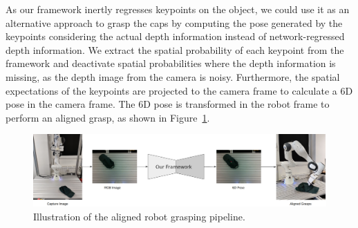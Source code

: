 As our framework inertly regresses keypoints on the object, we could use it as an alternative approach to grasp the caps by computing the pose
generated by the keypoints considering the actual depth information instead of network-regressed depth information.
We extract the spatial probability of each keypoint from the framework and deactivate spatial probabilities where the depth information is missing,
as the depth image from the camera is noisy. Furthermore, the spatial expectations of the keypoints are projected to the camera frame
to calculate a 6D pose in the camera frame. The 6D pose is transformed in the robot frame to perform an aligned grasp, as shown in Figure~\ref{fig:aligned_grasp}.

\begin{figure}[htb]
    \centering
    \includegraphics[scale=0.17]{images/aligned.png}
    \caption{Illustration of the aligned robot grasping pipeline.}
    \label{fig:aligned_grasp}
\end{figure}

